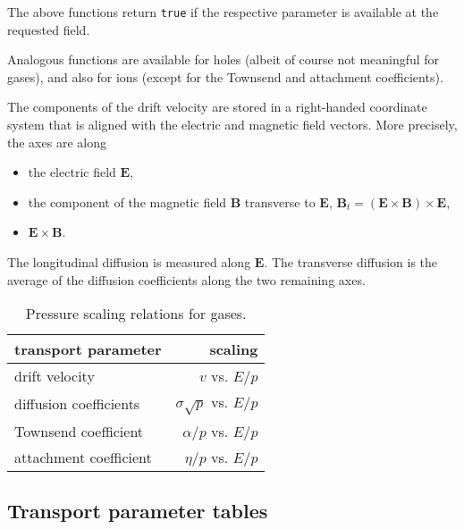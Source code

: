 The above functions return \texttt{true} if the respective parameter 
is available at the requested field.  

Analogous functions are available for holes 
(albeit of course not meaningful for gases), and also for ions 
(except for the Townsend and attachment coefficients). 

The components of the drift velocity are stored in a right-handed 
coordinate system that is aligned with the electric and magnetic field vectors.
More precisely, the axes are along
\begin{itemize}
  \item
  the electric field \(\mathbf{E}\),
  \item
  the component of the magnetic field \(\mathbf{B}\) transverse to 
  \(\mathbf{E}\), 
  \(\mathbf{B}_{t} = \left(\mathbf{E} \times \mathbf{B}\right) \times \textbf{E}\),
  \item
  \(\mathbf{E} \times \mathbf{B}\).
\end{itemize}
The longitudinal diffusion is measured along \(\mathbf{E}\).
The transverse diffusion is the average of the diffusion coefficients 
along the two remaining axes.

\begin{table}
  \centering
  \caption{Pressure scaling relations for gases.}
  \label{Tab:PressureScaling}
  \begin{tabular}{l r}
    \toprule
    transport parameter & scaling \\
    \midrule
    drift velocity & \(v\) vs. \(E/p\) \\
    diffusion coefficients & \(\sigma\sqrt{p}\) vs. \(E/p\) \\
    Townsend coefficient & \(\alpha / p\) vs. \(E/p\) \\
    attachment coefficient & \(\eta / p\) vs. \(E/p\) \\ 
    \bottomrule
  \end{tabular}
\end{table}

\subsection{Transport parameter tables}

